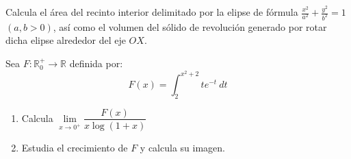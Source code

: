 \documentclass[12pt]{article}
\begin{document}
    \begin{ejercicio}[2 puntos]
        Calcula el área del recinto interior delimitado por la elipse de fórmula $\frac{x^2}{a^2}+\frac{y^2}{b^2} = 1$ $(a,b>0)$, así como el volumen del sólido de revolución generado por rotar dicha elipse alrededor del eje $OX$.
    \end{ejercicio}

    \begin{ejercicio}[2 puntos]
        Sea $F:\mathbb{R}^+_0\longrightarrow \mathbb{R}$ definida por:
        \begin{equation*}
            F(x) = \int_{2}^{x^2+2} te^{-t}~dt 
        \end{equation*}
        \begin{enumerate}[label=\alph*)]
            \item Calcula $\lim\limits_{x\to0^+}\dfrac{F(x)}{x\log(1+x)}$
            \item Estudia el crecimiento de $F$ y calcula su imagen.
        \end{enumerate}
    \end{ejercicio}
    
    
    
    \newpage
\end{document}
